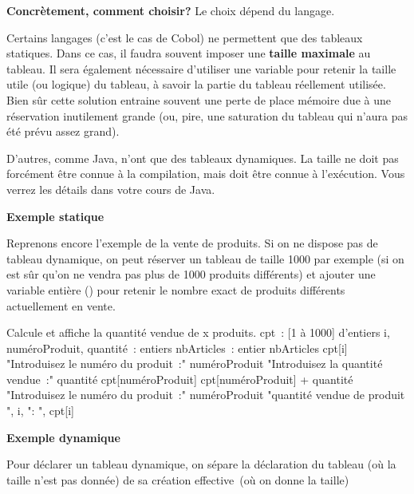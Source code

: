 	\textbf{Concrètement, comment choisir?}
	Le choix dépend du langage.

	Certains langages (c’est le cas de Cobol) ne permettent 
	que des tableaux statiques. Dans ce cas, il faudra souvent
	imposer une \textbf{taille maximale} au tableau. 
	Il sera également nécessaire d’utiliser une variable 
	pour retenir la taille utile (ou logique) du tableau, 
	à savoir la partie du tableau réellement utilisée.
	Bien sûr cette solution entraine souvent une perte de place mémoire due
	à une réservation inutilement grande (ou, pire, une saturation du
	tableau qui n’aura pas été prévu assez grand).
	
	D'autres, comme Java, n'ont que des tableaux dynamiques. La taille ne doit 
	pas forcément être connue à la compilation, mais doit être connue à
	l'exécution. Vous verrez les détails dans votre cours de Java.

	\textbf{Exemple statique}

	Reprenons encore l’exemple de la vente de produits. 
	Si on ne dispose pas de tableau dynamique, on peut réserver
	un tableau de taille 1000 par exemple (si on est sûr qu’on ne vendra
	pas plus de 1000 produits différents) et ajouter une variable entière
	() pour retenir 
	le nombre exact de produits différents actuellement en vente.
	
	\begin{Pseudocode}
	\LComment Calcule et affiche la quantité vendue de x produits.
		\Empty
		\Decl cpt~:  [1 à 1000] d’entiers
		\Decl i, numéroProduit, quantité~: entiers
		\Decl nbArticles~: entier
		\Read nbArticles
		\Empty
			\Let cpt[i] 
		\EndFor
		\Empty
		\Write "Introduisez le numéro du produit~:"
		\Read numéroProduit
		\Empty
		\Empty
			\Write "Introduisez la quantité vendue~:"
			\Read quantité
			\Empty
			\Let cpt[numéroProduit] \Gets cpt[numéroProduit] + quantité
			\Empty
			\Write "Introduisez le numéro du produit~:"
			\Read numéroProduit
			\Empty
		\EndWhile
		\Empty
			\Write "quantité vendue de produit ", i, ": ", cpt[i]
		\EndFor
		\Empty
	\EndModule
	\end{Pseudocode}

	\textbf{Exemple dynamique}
	
	Pour déclarer un tableau dynamique, on sépare la déclaration du tableau
	(où la taille n’est pas donnée) de sa création effective~(où on donne
	la taille)

